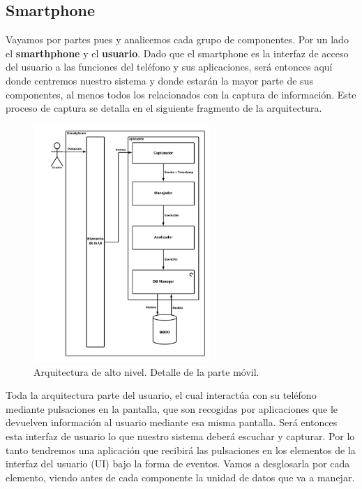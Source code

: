 \documentclass[12pt,a4paper,oneside]{book} %
\begin{document}
\subsection{Smartphone}
Vayamos por partes pues y analicemos cada grupo de componentes. Por un lado el \textbf{smarthphone} y el \textbf{usuario}. Dado que el smartphone es la interfaz de acceso del usuario a las funciones del teléfono y sus aplicaciones, será entonces aquí donde centremos nuestro sistema y donde estarán la mayor parte de sus componentes, al menos todos los relacionados con la captura de información. 
\newline
\newline
Este proceso de captura se detalla en el siguiente fragmento de la arquitectura. 
\begin{figure}[hbt]
  \begin{center} \setlength{\unitlength}{0.0105in}
     \includegraphics[width=0.6\textwidth]{pictures/architecture/highLevelArch02.png}
  \end{center}
  \caption[Arquitectura de alto nivel. Smartphone]{Arquitectura de alto nivel. Detalle de la parte móvil.}
\end{figure}
Toda la arquitectura parte del usuario, el cual interactúa con su teléfono mediante pulsaciones en la pantalla, que son recogidas por aplicaciones que le devuelven información al usuario mediante esa misma pantalla. Será entonces esta interfaz de usuario lo que nuestro sistema deberá escuchar y capturar. Por lo tanto tendremos una aplicación que recibirá las pulsaciones en los elementos de la interfaz del usuario (UI) bajo la forma de eventos. 
\newline
\newline
Vamos a desglosarla por cada elemento, viendo antes de cada componente la unidad de datos que va a manejar.
\newline
\newline
\end{document}
